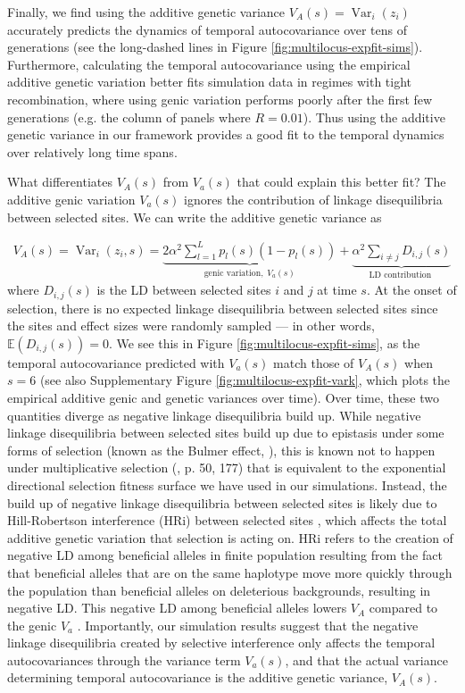 \documentclass[11pt]{article}
\newcommand{\E}{\mathbb{E}}
\DeclareMathOperator{\var}{Var}
\begin{document}
Finally, we find using the additive genetic variance $V_A(s) = \var_i(z_i)$
accurately predicts the dynamics of temporal autocovariance over tens of
generations (see the long-dashed lines in Figure
\ref{fig:multilocus-expfit-sims}). Furthermore, calculating the temporal
autocovariance using the empirical additive genetic variation better fits
simulation data in regimes with tight recombination, where using genic
variation performs poorly after the first few generations (e.g. the column of
panels where $R=0.01$). Thus using the additive genetic variance in our
framework provides a good fit to the temporal dynamics over relatively long
time spans.

What differentiates $V_A(s)$ from $V_a(s)$ that could explain this better fit?
The additive genic variation $V_a(s)$ ignores the contribution of linkage
disequilibria between selected sites. We can write the additive genetic
variance as

\begin{align}
  V_A(s) = \var_i(z_i, s) = \underbrace{2 \alpha^2 \sum_{l=1}^L p_{l}(s) (1-p_{l}(s))}_{\text{genic variation}, \; V_a(s)} +
  \underbrace{\alpha^2 \sum_{i\ne j} D_{i,j}(s)}_\text{LD contribution }
\label{eq:var-genic-z}
\end{align}
%
where $D_{i,j}(s)$ is the LD between selected sites $i$ and $j$ at time $s$.
At the onset of selection, there is no expected linkage disequilibria between
selected sites since the sites and effect sizes were randomly sampled --- in
other words, $\E(D_{i,j}(s)) = 0$. We see this in Figure
\ref{fig:multilocus-expfit-sims}, as the temporal autocovariance predicted with
$V_a(s)$ match those of $V_A(s)$ when $s = 6$ (see also Supplementary Figure
\ref{fig:multilocus-expfit-vark}, which plots the empirical additive genic and
genetic variances over time). Over time, these two quantities diverge as
negative linkage disequilibria build up. While negative linkage disequilibria
between selected sites build up due to epistasis under some forms of selection
(known as the Bulmer effect, \cite{Bulmer1971-ae,Bulmer1980-zo}), this is known
not to happen under multiplicative selection (\cite{Burger2000-an}, p. 50, 177) that is equivalent to the exponential directional
selection fitness surface we have used in our simulations. Instead, the build
up of negative linkage disequilibria between selected sites is likely due to
Hill-Robertson interference (HRi) between selected sites
\parencite{Hill1966-kd}, which affects the total additive genetic variation
that selection is acting on. HRi refers to the creation of negative LD among
beneficial alleles in finite population resulting from the fact that beneficial
alleles that are on the same haplotype move more quickly through the population
than beneficial alleles on deleterious backgrounds, resulting in negative LD.
This negative LD among beneficial alleles lowers $V_A$ compared to the genic
$V_a$ \parencite{Barton2005-zq,Crouch2017-xr,Good2014-yz}.  Importantly, our
simulation results suggest that the negative linkage disequilibria created by
selective interference only affects the temporal autocovariances through the
variance term $V_a(s)$, and that the actual variance determining temporal
autocovariance is the additive genetic variance, $V_A(s)$.
\end{document}
